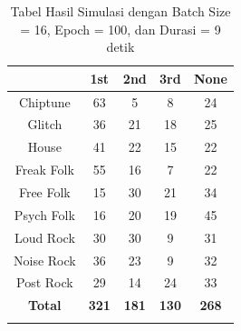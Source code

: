 \begin{longtable}[c]{|c|c|c|c|c|}
	\hline
	\textbf{}      & \textbf{1st} & \textbf{2nd} & \textbf{3rd} & \textbf{None} \\ \hline
	\endfirsthead
	\endhead
	Chiptune       & 63           & 5            & 8            & 24            \\ \hline
	Glitch         & 36           & 21           & 18           & 25            \\ \hline
	House          & 41           & 22           & 15           & 22            \\ \hline
	Freak Folk     & 55           & 16           & 7            & 22            \\ \hline
	Free Folk      & 15           & 30           & 21           & 34            \\ \hline
	Psych Folk     & 16           & 20           & 19           & 45            \\ \hline
	Loud Rock      & 30           & 30           & 9            & 31            \\ \hline
	Noise Rock     & 36           & 23           & 9            & 32            \\ \hline
	Post Rock      & 29           & 14           & 24           & 33            \\ \hline
	\textbf{Total} & \textbf{321} & \textbf{181} & \textbf{130} & \textbf{268}  \\ \hline
	\caption{Tabel Hasil Simulasi dengan Batch Size = 16, Epoch = 100, dan Durasi = 9 detik}
	\label{tab:my-table}\\
\end{longtable}

